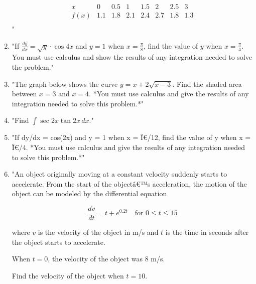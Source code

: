 \documentclass{article}
\begin{document}
\begin{enumerate}
\[
\begin{array}{c|ccccccc}
x & 0 & 0.5 & 1 & 1.5 & 2 & 2.5 & 3 \\
\hline
f(x) & 1.1 & 1.8 & 2.1 & 2.4 & 2.7 & 1.8 & 1.3 \\
\end{array}
\]"
\vspace{3cm}
\item "If \( \frac{dy}{dx} = \sqrt{y} \cdot \cos 4x \) and \( y = 1 \) when \( x = \frac{\pi}{8} \), find the value of \( y \) when \( x = \frac{\pi}{4} \). You must use calculus and show the results of any integration needed to solve the problem."
\vspace{3cm}
\item "The graph below shows the curve \( y = x + 2\sqrt{x - 3} \). Find the shaded area between \( x = 3 \) and \( x = 4 \). *You must use calculus and give the results of any integration needed to solve this problem.*"
\vspace{3cm}
\item "Find \(\int \sec 2x \tan 2x \, dx\)."
\vspace{3cm}
\item "If dy/dx = cos(2x) and y = 1 when x = Ï€/12, find the value of y when x = Ï€/4. *You must use calculus and give the results of any integration needed to solve this problem.*"
\vspace{3cm}
\item "An object originally moving at a constant velocity suddenly starts to accelerate. From the start of the objectâ€™s acceleration, the motion of the object can be modeled by the differential equation

\[ \frac{dv}{dt} = t + e^{0.2t} \quad \text{for } 0 \leq t \leq 15 \]

where \( v \) is the velocity of the object in m/s and \( t \) is the time in seconds after the object starts to accelerate.

When \( t = 0 \), the velocity of the object was 8 m/s.

Find the velocity of the object when \( t = 10 \).


\end{enumerate}
\end{document}

